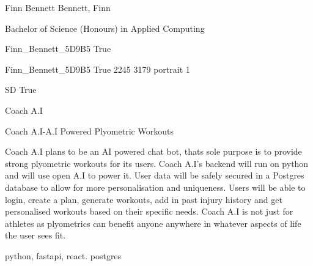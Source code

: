 
\begingroup{}\relax



\def\Key{Finn_Bennett_5D9B5}

{Finn Bennett}
{Bennett, Finn}

{Bachelor of Science (Honours) in Applied Computing}

{Finn_Bennett_5D9B5}
{True}

{Finn_Bennett_5D9B5}
{True}
{2245}
{3179}
{portrait}
{1}

{SD}
{True}

{Coach A.I}

{Coach A.I-A.I Powered Plyometric Workouts}

{Coach A.I plans to be an AI powered chat bot, thats sole purpose is to provide strong plyometric workouts for its users. Coach A.I's backend will run on python and will use open A.I to power it. User data will be safely secured in a Postgres database to allow for more personalisation and uniqueness. Users will be able to login, create a plan, generate workouts, add in past injury history and get personalised workouts based on their specific needs. Coach A.I is not just for athletes as plyometrics can benefit anyone anywhere in whatever aspects of life the user sees fit.}

{python, fastapi, react. postgres}

